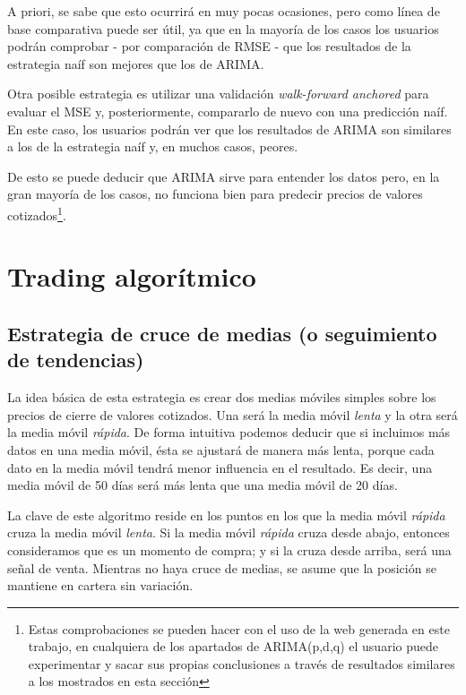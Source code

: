 A priori, se sabe que esto ocurrirá en muy pocas ocasiones, pero como línea de base comparativa puede ser útil, ya que en la mayoría de los casos los usuarios podrán comprobar - por comparación de RMSE - que los resultados de la estrategia naíf son mejores que los de ARIMA. 


Otra posible estrategia es utilizar una validación \emph{walk-forward anchored}\citep{online:walk_forward} para evaluar el MSE y, posteriormente, compararlo de nuevo con una predicción naíf. En este caso, los usuarios podrán ver que los resultados de ARIMA son similares a los de la estrategia naíf y, en muchos casos, peores. 


De esto se puede deducir que ARIMA sirve para entender los datos pero, en la gran mayoría de los casos, no funciona bien para predecir precios de valores cotizados\footnote{Estas comprobaciones se pueden hacer con el uso de la web generada en este trabajo, en cualquiera de los apartados de ARIMA(p,d,q) el usuario puede experimentar y sacar sus propias conclusiones a través de resultados similares a los mostrados en esta sección}. 


\section{Trading algorítmico}\label{algo_trading}

\subsection{Estrategia de cruce de medias (o seguimiento de tendencias)}

La idea básica de esta estrategia es crear dos medias móviles simples sobre los precios de cierre de valores cotizados. Una será la media móvil \emph{lenta} y la otra será la media móvil \emph{rápida}. De forma intuitiva podemos deducir que si incluimos más datos en una media móvil, ésta se ajustará de manera más lenta, porque cada dato en la media móvil tendrá menor influencia en el resultado. Es decir, una media móvil de 50 días será más lenta que una media móvil de 20 días. 

La clave de este algoritmo reside en los puntos en los que la media móvil \emph{rápida} cruza la media móvil \emph{lenta}. Si la media móvil \emph{rápida} cruza desde abajo, entonces consideramos que es un momento de compra; y si la cruza desde arriba, será una señal de venta. Mientras no haya cruce de medias, se asume que la posición se mantiene en cartera sin variación. 

